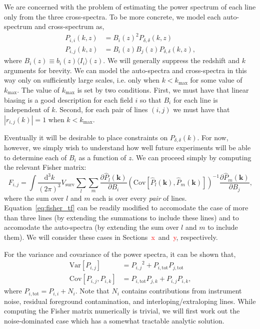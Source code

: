 \documentclass{aastex62}
\newcommand{\Gus}[1]{\textcolor{red}{#1}}
\newcommand{\abs}[1]{\left| #1 \right|}
\newcommand{\beq}{\begin{equation}}
\newcommand{\eeq}{\end{equation}}
\newcommand{\ps}[1]{\ensuremath{P_{#1,#1}}}
\newcommand{\xps}[2]{\ensuremath{P_{#1,#2}}}
\newcommand{\kmax}{\ensuremath{k_{\text{max}}}}
\newcommand{\denps}{\ensuremath{P_{\delta,\delta}}}
\newcommand{\pstot}[1]{\ensuremath{P_{#1,\text{tot}}}}
\newcommand{\Var}[1]{\mathrm{Var}[#1]}
\newcommand{\Cov}[2]{\mathrm{Cov}[#1,#2]}
\newcommand{\avg}[1]{\ensuremath{\langle #1 \rangle}}
\begin{document}
We are concerned with the problem of estimating the power spectrum of each
line only from the three cross-spectra. To be more concrete, we model each
auto-spectrum and cross-spectrum as,
\beq\label{eq:auto_xps}
\begin{split}
\ps{i}(k,z) &= B_i(z)^2 \denps(k,z) \\
\xps{i}{j}(k,z) &= B_i(z) B_j(z) \denps(k,z)\text{,}
\end{split}
\eeq
where $B_i(z) \equiv b_i(z) \avg{I_i}(z)$. We will generally suppress the
redshift and $k$ arguments for brevity. We can model the auto-spectra and
cross-spectra in this way only on sufficiently large scales, i.e. only when
$k<\kmax$ for some value of \kmax{}. The value of \kmax{} is set by two
conditions. First, we must have that linear biasing is a good description for
each field $i$ so that $B_i$ for each line is independent of $k$. Second, for
each pair of lines $(i,j)$ we must have that $\abs{r_{i,j}(k)} = 1$ when
$k<\kmax$.

Eventually it will be desirable to place constraints on $\denps(k)$. For now,
however, we simply wish to understand how well future experiments will be able
to determine each of $B_i$ as a function of $z$. We can proceed simply by
computing the relevant Fisher matrix:
\beq\label{eq:fisher_tf}
F_{i,j} = 
\int \frac{\text{d}^3k}{(2\pi)^3} V_{\text{surv}}
\sum_{l} \sum_{m}
\frac{\partial \hat{P}_{l}(\bm{k})}{\partial B_i}
\left(\Cov{\hat{P}_{l}(\bm{k})}{\hat{P}_{m}(\bm{k})}\right)^{-1}
\frac{\partial \hat{P}_{m}(\bm{k})}{\partial B_j}\text{,}
\eeq
where the sum over $l$ and $m$ each is over every \emph{pair} of lines.
Equation~\ref{eq:fisher_tf} can be readily modified to accomodate the case of
more than three lines (by extending the summations to include these lines) and
to accomodate the auto-spectra (by extending the sum over $l$ and $m$ to
include them). We will consider these cases in Sections~\Gus{x}~and~\Gus{y},
respectively.

For the variance and covariance of the power spectra, it can be shown that,
\beq\label{eq:var_cov}
\begin{split}
\Var{\xps{i}{j}} &= \xps{i}{j}^2 + \pstot{i}\pstot{j} \\
\Cov{\xps{i}{j}}{\xps{i}{k}} &= \pstot{i}\xps{j}{k} +
\xps{i}{j}\xps{i}{k}\text{,}
\end{split}
\eeq
where $\pstot{i} = \ps{i} + N_i$. Note that $N_i$ contains contributions
from instrument noise, residual foreground contamination, and
interloping/extraloping lines. While computing the Fisher matrix numerically
is trivial, we will first work out the noise-dominated case which has a
somewhat tractable analytic solution.
\end{document}
